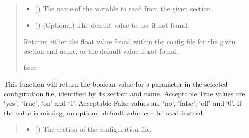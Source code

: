 \documentclass[letterpaper,10pt,english]{sphinxmanual}
\begin{document}
\begin{fulllineitems}
\begin{fulllineitems}
\begin{quote}
\begin{description}
\begin{itemize}
\item {} 
\sphinxAtStartPar
{} () \textendash{} The name of the variable to read from the given section.

\item {} 
\sphinxAtStartPar
{} () \textendash{} (Optional) The default value to use if not found.

\end{itemize}

\sphinxAtStartPar
Returns either the float value found within the config file
for the given section and name, or the default value if not found.

\sphinxAtStartPar
float

\end{description}\end{quote}

\end{fulllineitems}


\begin{fulllineitems}
\label{\detokenize{modules/input/config_handler:qnav.input.config_handler.ConfigHandler.get_bool}}
\pysigstartsignatures
{}
\pysigstopsignatures
\sphinxAtStartPar
This function will return the boolean value for a parameter in the
selected configuration file, identified by its section and name.
Acceptable True values are ‘yes’, ‘true’, ‘on’ and ‘1’. Acceptable
False values are ‘no’, ‘false’, ‘off’ and ‘0’. If the value is missing,
an optional default value can be used instead.
\begin{quote}\begin{description}
\begin{itemize}
\item {} 
\sphinxAtStartPar
{} () \textendash{} The section of the configuration file.


\end{itemize}
\end{description}
\end{quote}
\end{fulllineitems}
\end{fulllineitems}
\end{document}
